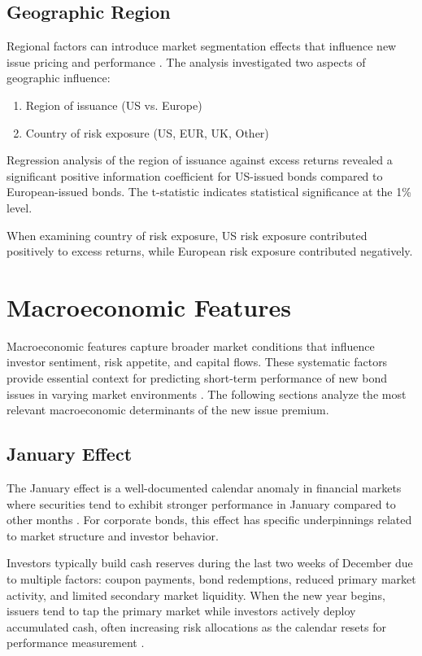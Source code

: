 \subsection{Geographic Region}
Regional factors can introduce market segmentation effects that influence new issue pricing and performance \parencite{Geerts2022PredictingYield}. The analysis investigated two aspects of geographic influence:

\begin{enumerate}
    \item Region of issuance (US vs. Europe)
    \item Country of risk exposure (US, EUR, UK, Other)
\end{enumerate}

Regression analysis of the region of issuance against excess returns revealed a significant positive information coefficient for US-issued bonds compared to European-issued bonds. The t-statistic indicates statistical significance at the 1\% level.

When examining country of risk exposure, US risk exposure contributed positively to excess returns, while European risk exposure contributed negatively.

\section{Macroeconomic Features}

Macroeconomic features capture broader market conditions that influence investor sentiment, risk appetite, and capital flows. These systematic factors provide essential context for predicting short-term performance of new bond issues in varying market environments \parencite{Geerts2022PredictingYield}. The following sections analyze the most relevant macroeconomic determinants of the new issue premium.

\subsection{January Effect}
The January effect is a well-documented calendar anomaly in financial markets where securities tend to exhibit stronger performance in January compared to other months \parencite{Nisar2021MunichArchive}. For corporate bonds, this effect has specific underpinnings related to market structure and investor behavior.

Investors typically build cash reserves during the last two weeks of December due to multiple factors: coupon payments, bond redemptions, reduced primary market activity, and limited secondary market liquidity. When the new year begins, issuers tend to tap the primary market while investors actively deploy accumulated cash, often increasing risk allocations as the calendar resets for performance measurement \parencite{Nisar2021MunichArchive}.

